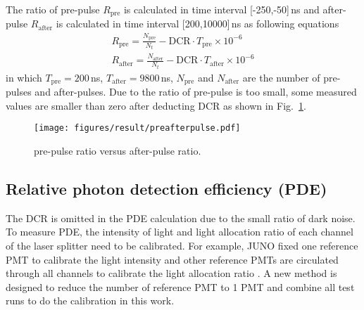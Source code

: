 The ratio of pre-pulse $R_{\mathrm{pre}}$ is calculated in time interval [-250,-50]\,ns and after-pulse $R_{\mathrm{after}}$ is calculated in time interval [200,10000]\,ns as following equations
\begin{align}
    R_{\mathrm{pre}} = \frac{N_{\mathrm{pre}}}{N_t} - \mathrm{DCR}\cdot T_{\mathrm{pre}}\times10^{-6}\\
    R_{\mathrm{after}} = \frac{N_{\mathrm{after}}}{N_t} - \mathrm{DCR}\cdot T_{\mathrm{after}}\times10^{-6}
\end{align}
in which $T_{\mathrm{pre}}=200$\,ns, $T_{\mathrm{after}}=9800$\,ns, $N_{\mathrm{pre}}$ and $N_{\mathrm{after}}$ are the number of pre-pulses and after-pulses. Due to the ratio of pre-pulse is too small, some measured values are smaller than zero after deducting DCR as shown in Fig.~\ref{fig:prepulseCompare}.

\begin{figure}[!htbp]
    \centering
    \texttt{[image: figures/result/preafterpulse.pdf]}
    \caption{pre-pulse ratio versus after-pulse ratio.}
    \label{fig:prepulseCompare}
\end{figure}

\subsection{Relative photon detection efficiency (PDE)}
The DCR is omitted in the PDE calculation due to the small ratio of dark noise. To measure PDE, the intensity of light and light allocation ratio of each channel of the laser splitter need to be calibrated. For example, JUNO fixed one reference PMT to calibrate the light intensity and other reference PMTs are circulated through all channels to calibrate the light allocation ratio \cite{Wonsak_2021}. A new method is designed to reduce the number of reference PMT to 1 PMT and combine all test runs to do the calibration in this work.

